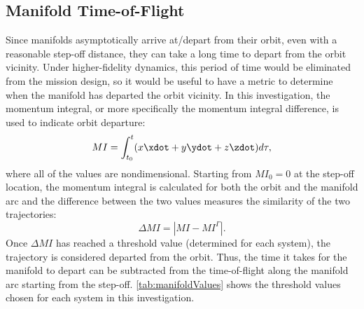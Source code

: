 \subsection{Manifold Time-of-Flight}
Since manifolds asymptotically arrive at/depart from their orbit, even with a reasonable step-off
distance, they can take a long time to depart from the orbit vicinity. Under higher-fidelity
dynamics, this period of time would be eliminated from the mission design, so it would be useful to
have a metric to determine when the manifold has departed the orbit vicinity. In this
investigation, the momentum integral, or more specifically the momentum integral difference, is
used to indicate orbit departure:
\begin{equation}
    MI=\int_{t_{0}}^{t}(x\xdot+y\ydot+z\zdot)d\tau,
    \label{eq:momentumintegral}
\end{equation}
where all of the values are nondimensional. Starting from $MI_{0}=0$ at the step-off location, the
momentum integral is calculated for both the orbit and the manifold arc and the difference between
the two values measures the similarity of the two trajectories:
\begin{equation}
    \Delta MI=|MI-MI^{\Gamma}|.
    \label{eq:momentumdifference}
\end{equation}
Once $\Delta MI$ has reached a threshold value (determined for each system), the trajectory is
considered departed from the orbit\cite{Guzzetti:2017}. Thus, the time it takes for the manifold to
depart can be subtracted from the time-of-flight along the manifold arc starting from the step-off.
\cref{tab:manifoldValues} shows the threshold values chosen for each system in this investigation.
